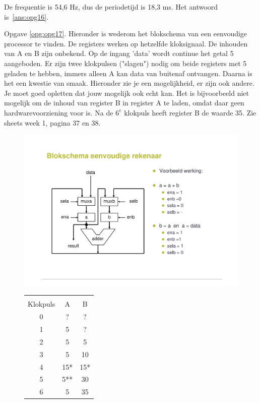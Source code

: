\documentclass[a4paper,12pt,fleqn,dutch]{tisdexam}
\begin{document}
\begin{questions}
De frequentie is 54,6 Hz, dus de periodetijd is 18,3 ms.
Het antwoord is~\ref{ans:opg16}.

\vspace{1em}
Opgave \ref{opg:opg17}. Hieronder is wederom het blokschema van een eenvoudige
processor te vinden. De registers werken op hetzelfde kloksignaal. De inhouden
van A en B zijn onbekend. Op de ingang 'data' wordt continue het getal 5
aangeboden. Er zijn twee klokpulsen ("slagen") nodig om beide registers met 5
geladen te hebben, immers alleen A kan data van buitenaf ontvangen. Daarna is
het een kwestie van smaak. Hieronder zie je een mogelijkheid, er zijn ook
andere. Je moet goed opletten dat jouw mogelijk ook echt kan. Het is
bijvoorbeeld niet mogelijk om de inhoud van register B in register A te laden,
omdat daar geen hardwarevoorziening voor is. Na de $6^{e}$ klokpuls heeft
register B de waarde 35. Zie sheets week 1, pagina 37 en 38.

\begin{figure}[H]
  \begin{minipage}[!t]{0.60\linewidth}
    \centering
	\includegraphics*[viewport=70 110 500 460,scale=0.55]{pINLMIC_eenvoudige_rekenaar.pdf}
  \end{minipage}\hfill
  \begin{minipage}[!t]{.350\linewidth}
    \begin{tabular}{ c | c c }
      \hline
                &       &               \\ [-2.9ex]
       Klokpuls &  A    &  B     \\ \hline
           0    &  ?    &  ?     \\
           1    &  5    &  ?     \\
           2    &  5    &  5     \\
           3    &  5    &  10    \\
           4    &  15*  &  15*   \\
           5    &  5**  &  30    \\
           6    &  5    &  35    \\ \hline
    \end{tabular}
    

\end{minipage}
\end{figure}
\end{questions}
\end{document}
